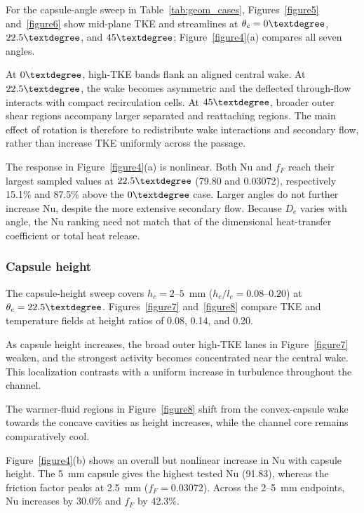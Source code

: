 \documentclass[energies,article,submit,moreauthors,noheaderline]{Definitions/mdpi}
\newcommand{\degree}{\texorpdfstring{\ensuremath{^\circ}}{\textdegree}}
\def\ensuremath#1{}%
\def\degree{\textdegree}%
\begin{document}
For the capsule-angle sweep in Table~\ref{tab:geom_cases}, Figures~\ref{figure5} and~\ref{figure6} show mid-plane TKE and streamlines at $\theta_c=0\degree$, $22.5\degree$, and $45\degree$; Figure~\ref{figure4}(a) compares all seven angles.

At $0\degree$, high-TKE bands flank an aligned central wake. At $22.5\degree$, the wake becomes asymmetric and the deflected through-flow interacts with compact recirculation cells. At $45\degree$, broader outer shear regions accompany larger separated and reattaching regions. The main effect of rotation is therefore to redistribute wake interactions and secondary flow, rather than increase TKE uniformly across the passage.





The response in Figure~\ref{figure4}(a) is nonlinear. Both Nu and $f_F$ reach their largest sampled values at $22.5\degree$ (79.80 and 0.03072), respectively 15.1\% and 87.5\% above the $0\degree$ case. Larger angles do not further increase Nu, despite the more extensive secondary flow. Because $D_e$ varies with angle, the Nu ranking need not match that of the dimensional heat-transfer coefficient or total heat release.

\subsubsection{Capsule height}
\label{sec:disc_capsule_height}

The capsule-height sweep covers $h_c=2$--$5$~mm ($h_c/l_c=0.08$--$0.20$) at $\theta_c=22.5\degree$. Figures~\ref{figure7} and~\ref{figure8} compare TKE and temperature fields at height ratios of 0.08, 0.14, and 0.20.



As capsule height increases, the broad outer high-TKE lanes in Figure~\ref{figure7} weaken, and the strongest activity becomes concentrated near the central wake. This localization contrasts with a uniform increase in turbulence throughout the channel.



The warmer-fluid regions in Figure~\ref{figure8} shift from the convex-capsule wake towards the concave cavities as height increases, while the channel core remains comparatively cool.

Figure~\ref{figure4}(b) shows an overall but nonlinear increase in Nu with capsule height. The 5~mm capsule gives the highest tested Nu (91.83), whereas the friction factor peaks at 2.5~mm ($f_F=0.03072$). Across the 2--5~mm endpoints, Nu increases by 30.0\% and $f_F$ by 42.3\%.
\end{document}

